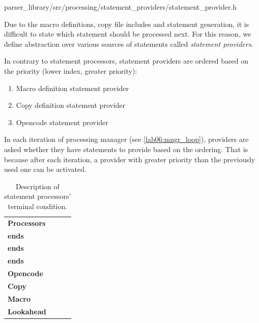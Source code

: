 {parser\_library/src/processing/statement\_providers/statement\_provider.h}
\label{lab06:sect_prov}

Due to the macro definitions, copy file includes and statement generation, it is difficult to state which statement should be processed next. For this reason, we define abstraction over various sources of statements called \emph{statement providers}.

In contrary to statement processors, statement providers are ordered based on the priority (lower index, greater priority):

\begin{enumerate}
	\item Macro definition statement provider
	\item Copy definition statement provider
	\item Opencode statement provider
\end{enumerate}

In each iteration of processing manager (see \cref{lab06:mngr_loop}), providers are asked whether they have statements to provide based on the ordering. That is because after each iteration, a provider with greater priority than the previously used one can be activated. 


\begin{table}
	\centering
	\begin{tabular}{@{}p{}ccc@{}}
		\textbf{Processors} & \thead{\textbf{Macro provider} \\ \textbf{ends}} & \thead{\textbf{Copy provider} \\ \textbf{ends}} & \thead{\textbf{Opencode provider} \\ \textbf{ends}} \\ \toprule
		\textbf{Opencode}   &                      \cont                       &                      \cont                      &                        \fin                         \\
		\textbf{Copy}       &                      \cont                       &                      \cont                      &                        \fin                         \\
		\textbf{Macro}      &                       \fin                       &                      \cont                      &                        \fin                         \\
		\textbf{Lookahead}  &                       \fin                       &                      \cont                      &                        \fin                         \\ \bottomrule
	\end{tabular}
	\caption{Description of statement processors' terminal condition.}
	\label{tab06:term_cond}
\end{table}

